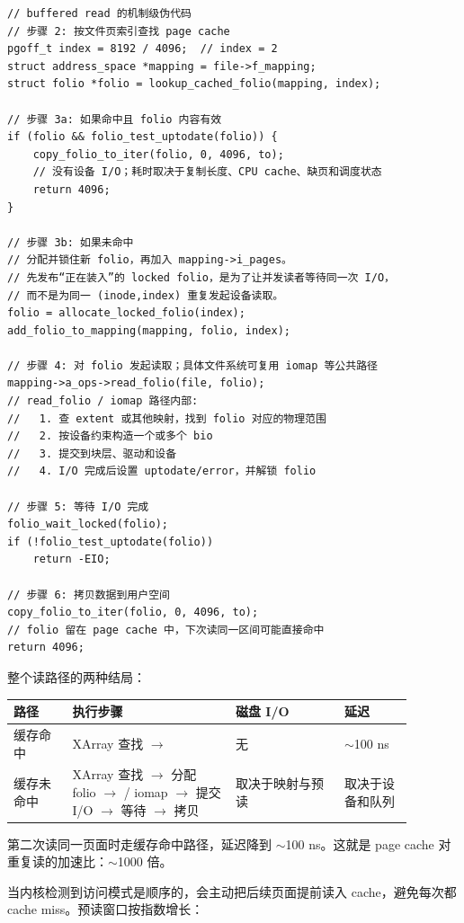 \begin{filesystemlayout}
\begin{lstlisting}
// buffered read 的机制级伪代码
// 步骤 2: 按文件页索引查找 page cache
pgoff_t index = 8192 / 4096;  // index = 2
struct address_space *mapping = file->f_mapping;
struct folio *folio = lookup_cached_folio(mapping, index);

// 步骤 3a: 如果命中且 folio 内容有效
if (folio && folio_test_uptodate(folio)) {
    copy_folio_to_iter(folio, 0, 4096, to);
    // 没有设备 I/O；耗时取决于复制长度、CPU cache、缺页和调度状态
    return 4096;
}

// 步骤 3b: 如果未命中
// 分配并锁住新 folio，再加入 mapping->i_pages。
// 先发布“正在装入”的 locked folio，是为了让并发读者等待同一次 I/O，
// 而不是为同一 (inode,index) 重复发起设备读取。
folio = allocate_locked_folio(index);
add_folio_to_mapping(mapping, folio, index);

// 步骤 4: 对 folio 发起读取；具体文件系统可复用 iomap 等公共路径
mapping->a_ops->read_folio(file, folio);
// read_folio / iomap 路径内部:
//   1. 查 extent 或其他映射，找到 folio 对应的物理范围
//   2. 按设备约束构造一个或多个 bio
//   3. 提交到块层、驱动和设备
//   4. I/O 完成后设置 uptodate/error，并解锁 folio

// 步骤 5: 等待 I/O 完成
folio_wait_locked(folio);
if (!folio_test_uptodate(folio))
    return -EIO;

// 步骤 6: 拷贝数据到用户空间
copy_folio_to_iter(folio, 0, 4096, to);
// folio 留在 page cache 中，下次读同一区间可能直接命中
return 4096;
\end{lstlisting}

整个读路径的两种结局：

\begin{longtable}{|F{0.13\linewidth}|F{0.36\linewidth}|F{0.24\linewidth}|F{0.15\linewidth}|}
\toprule
{}
路径 & 执行步骤 & 磁盘 I/O & 延迟 \\
\midrule
缓存命中 & XArray 查找 $\to$  & 无 & $\sim$100 ns \\\tablerowrule
缓存未命中 & XArray 查找 $\to$ 分配 folio $\to$  / iomap $\to$ 提交 I/O $\to$ 等待 $\to$ 拷贝 & 取决于映射与预读 & 取决于设备和队列 \\
\bottomrule
\end{longtable}

第二次读同一页面时走缓存命中路径，延迟降到 $\sim$100 ns。这就是 page cache 对重复读的加速比：$\sim$1000 倍。


当内核检测到访问模式是顺序的，会主动把后续页面提前读入 cache，避免每次都 cache miss。预读窗口按指数增长：


\end{filesystemlayout}
